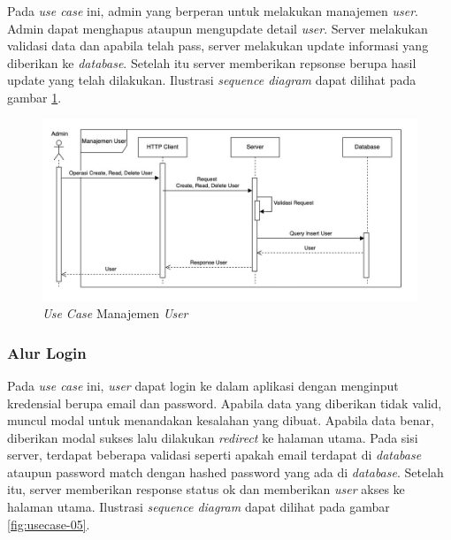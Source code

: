 Pada \textit{use case} ini, admin yang berperan untuk melakukan manajemen \textit{user}. Admin dapat menghapus ataupun mengupdate detail \textit{user}. Server melakukan validasi data dan apabila telah pass, server melakukan update informasi yang diberikan ke \textit{database}. Setelah itu server memberikan repsonse berupa hasil update yang telah dilakukan. Ilustrasi \textit{sequence diagram} dapat dilihat pada gambar \ref{fig:usecase-04}.

\begin{figure}[ht]
  \centering
  \includegraphics[width=1\textwidth]{resources/chapter-3/usecase/uc-04.jpg}
  \caption{\textit{Use Case} Manajemen \textit{User}}
  \label{fig:usecase-04}
\end{figure}

\subsubsection{Alur Login}

Pada \textit{use case} ini, \textit{user} dapat login ke dalam aplikasi dengan menginput kredensial berupa email dan password. Apabila data yang diberikan tidak valid, muncul modal untuk menandakan kesalahan yang dibuat. Apabila data benar, diberikan modal sukses lalu dilakukan \textit{redirect} ke halaman utama. Pada sisi server, terdapat beberapa validasi seperti apakah email terdapat di \textit{database} ataupun password match dengan hashed password yang ada di \textit{database}. Setelah itu, server memberikan response status ok dan memberikan \textit{user} akses ke halaman utama. Ilustrasi \textit{sequence diagram} dapat dilihat pada gambar \ref{fig:usecase-05}.

